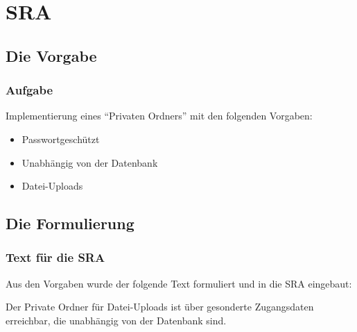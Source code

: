 \section{SRA}
\subsection{Die Vorgabe}
\begin{frame} %
  \frametitle{Aufgabe} %

Implementierung eines "`Privaten Ordners"' mit den folgenden Vorgaben:
  \begin{itemize}
   \item Passwortgeschützt
   \item Unabhängig von der Datenbank
   \item Datei-Uploads
  \end{itemize}

\end{frame}

\subsection{Die Formulierung}
\begin{frame} %
  \frametitle{Text für die SRA} %

  Aus den Vorgaben wurde der folgende Text formuliert und in die SRA eingebaut:
  \begin{block}{}
	Der Private Ordner für Datei-Uploads ist über gesonderte Zugangsdaten erreichbar, die unabhängig von der Datenbank sind.
  \end{block}

\end{frame}
